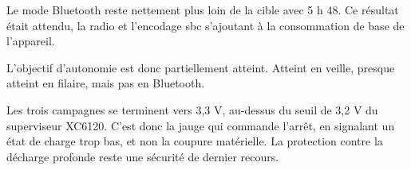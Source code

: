 Le mode Bluetooth reste nettement plus loin de la cible avec 5 h 48. Ce résultat était attendu, la radio et l'encodage \gls{sbc} s'ajoutant à la consommation de base de l'appareil.

L'objectif d'autonomie est donc partiellement atteint. Atteint en veille, presque atteint en filaire, mais pas en Bluetooth.

Les trois campagnes se terminent vers 3,3 V, au-dessus du seuil de 3,2 V du superviseur XC6120. C'est donc la jauge qui commande l'arrêt, en signalant un état de charge trop bas, et non la coupure matérielle. La protection contre la décharge profonde reste une sécurité de dernier recours.